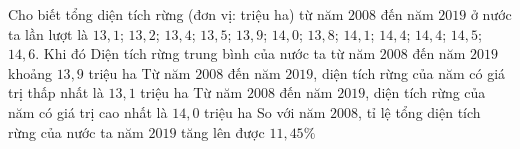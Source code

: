 \begin{ex}%
	Cho biết tổng diện tích rừng (đơn vị: triệu ha) từ năm $2008$ đến năm $2019$ ở nước ta lần lượt là $13{,}1$; $13{,}2$; $13{,}4$; $13{,}5$; $13{,}9$; $14{,}0$; $13{,}8$; $14{,}1$; $14{,}4$; $14{,}4$; $14{,}5$; $14{,}6$. Khi đó
	\choiceTF
	{\True Diện tích rừng trung bình của nước ta từ năm $2008$ đến năm $2019$ khoảng $13{,}9$ triệu ha}
	{\True Từ năm $2008$ đến năm $2019$, diện tích rừng của năm có giá trị thấp nhất là $13{,}1$ triệu ha}
	{Từ năm $2008$ đến năm $2019$, diện tích rừng của năm có giá trị cao nhất là $14{,}0$ triệu ha}
	{\True So với năm $2008$, tỉ lệ tổng diện tích rừng của nước ta năm $2019$ tăng lên được $11{,}45\%$}
\end{ex}

